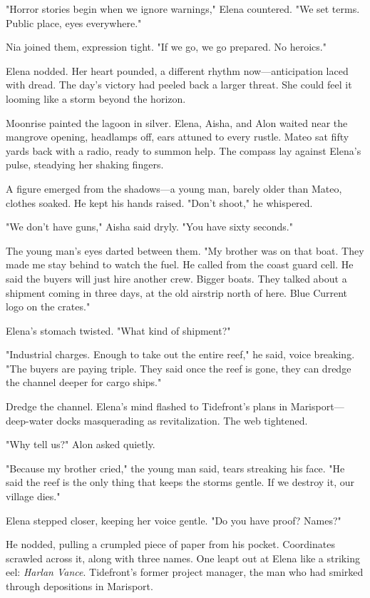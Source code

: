 "Horror stories begin when we ignore warnings," Elena countered. "We set terms. Public place, eyes everywhere."

Nia joined them, expression tight. "If we go, we go prepared. No heroics."

Elena nodded. Her heart pounded, a different rhythm now—anticipation laced with dread. The day's victory had peeled back a larger threat. She could feel it looming like a storm beyond the horizon.

\bigskip

Moonrise painted the lagoon in silver. Elena, Aisha, and Alon waited near the mangrove opening, headlamps off, ears attuned to every rustle. Mateo sat fifty yards back with a radio, ready to summon help. The compass lay against Elena's pulse, steadying her shaking fingers.

A figure emerged from the shadows—a young man, barely older than Mateo, clothes soaked. He kept his hands raised. "Don't shoot," he whispered.

"We don't have guns," Aisha said dryly. "You have sixty seconds."

The young man's eyes darted between them. "My brother was on that boat. They made me stay behind to watch the fuel. He called from the coast guard cell. He said the buyers will just hire another crew. Bigger boats. They talked about a shipment coming in three days, at the old airstrip north of here. Blue Current logo on the crates."

Elena's stomach twisted. "What kind of shipment?"

"Industrial charges. Enough to take out the entire reef," he said, voice breaking. "The buyers are paying triple. They said once the reef is gone, they can dredge the channel deeper for cargo ships."

Dredge the channel. Elena's mind flashed to Tidefront's plans in Marisport—deep-water docks masquerading as revitalization. The web tightened.

"Why tell us?" Alon asked quietly.

"Because my brother cried," the young man said, tears streaking his face. "He said the reef is the only thing that keeps the storms gentle. If we destroy it, our village dies."

Elena stepped closer, keeping her voice gentle. "Do you have proof? Names?"

He nodded, pulling a crumpled piece of paper from his pocket. Coordinates scrawled across it, along with three names. One leapt out at Elena like a striking eel: \textit{Harlan Vance}. Tidefront's former project manager, the man who had smirked through depositions in Marisport.

